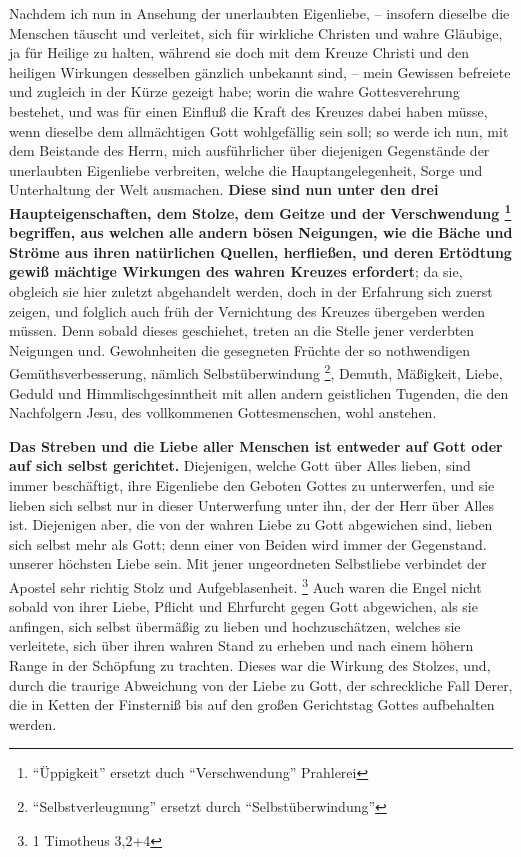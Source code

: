 Nachdem ich nun in Ansehung der unerlaubten Eigenliebe, -- insofern dieselbe die
Menschen täuscht und verleitet, sich für wirkliche Christen und wahre Gläubige,
ja für Heilige zu halten, während sie doch mit dem Kreuze Christi und den
heiligen Wirkungen desselben gänzlich unbekannt sind, -- mein Gewissen befreiete
und zugleich in der Kürze gezeigt habe; worin die wahre Gottesverehrung
bestehet, und was für einen Einfluß die Kraft des Kreuzes dabei haben müsse,
wenn dieselbe dem allmächtigen Gott wohlgefällig sein soll; so werde ich nun,
mit dem Beistande des Herrn, mich ausführlicher über diejenigen Gegenstände der
unerlaubten Eigenliebe  verbreiten, welche die Hauptangelegenheit, Sorge und
Unterhaltung der Welt ausmachen. \textbf{Diese sind nun unter den drei
Haupteigenschaften, dem Stolze, dem Geitze und der Verschwendung \footnote{"`Üppigkeit"' ersetzt duch "`Verschwendung"' Prahlerei}  begriffen, aus
welchen alle andern bösen Neigungen, wie die Bäche und Ströme aus ihren
natürlichen Quellen, herfließen, und deren Ertödtung gewiß mächtige Wirkungen
des wahren Kreuzes erfordert}; da sie, obgleich sie hier zuletzt abgehandelt
werden, doch in der Erfahrung sich zuerst zeigen, und folglich auch früh der
Vernichtung des Kreuzes übergeben werden müssen. Denn sobald dieses geschiehet,
treten an die Stelle jener verderbten Neigungen und. Gewohnheiten die gesegneten
Früchte der so nothwendigen Gemüthsverbesserung, nämlich Selbstüberwindung \footnote{"`Selbstverleugnung"' ersetzt durch "`Selbstüberwindung"'},
Demuth, Mäßigkeit, Liebe, Geduld und Himmlischgesinntheit mit allen andern
geistlichen Tugenden, die den Nachfolgern Jesu, des vollkommenen Gottesmenschen,
wohl anstehen.

\medskip

\textbf{Das Streben und die Liebe aller Menschen ist entweder auf Gott oder auf sich
selbst gerichtet.} Diejenigen, welche Gott über Alles lieben, sind immer
beschäftigt, ihre Eigenliebe den Geboten Gottes zu unterwerfen, und sie lieben
sich selbst nur in dieser Unterwerfung unter ihn, der der Herr über Alles ist.
Diejenigen aber, die von der wahren Liebe zu Gott abgewichen sind, lieben sich
selbst mehr als Gott; denn einer von Beiden wird immer der Gegenstand. unserer
höchsten Liebe sein. Mit jener ungeordneten Selbstliebe verbindet der Apostel
sehr richtig Stolz und Aufgeblasenheit.
\footnote{1 Timotheus 3,2+4}
Auch waren die
Engel nicht sobald von ihrer Liebe, Pflicht und Ehrfurcht gegen Gott abgewichen,
als sie anfingen, sich selbst übermäßig zu lieben und hochzuschätzen, welches
sie verleitete, sich über ihren wahren Stand zu erheben und nach einem höhern
Range in der Schöpfung zu trachten. Dieses war die Wirkung des Stolzes, und,
durch die traurige Abweichung von der Liebe zu Gott, der schreckliche Fall
Derer, die in Ketten der Finsterniß bis auf den großen Gerichtstag Gottes
aufbehalten werden.

